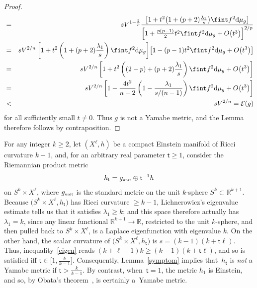 \documentclass[10pt,a4paper]{amsart}
\numberwithin{equation}{section}
\def\RR{\mathbb{R}}
\begin{document}
\begin{proof}
\begin{eqnarray*}
&=&sV^{1-\frac{2}{p}} \frac{\left[ 1+ t^2 \big(1+ (p+2)\frac{\lambda_1}{s} \big)\fint f^2 {\rm d}\mu_g\right] }{\left[ 1+ \frac{p(p-1)}{2} t^2\fint f^2 {\rm d}\mu_g +O\big(t^3\big) \right]^{2/p}} \\
&=&sV^{2/n} \left[ 1+ t^2 \left(1+ (p+2)\frac{\lambda_1}{s} \right)\fint f^2 {\rm d}\mu_g\right] }{\left[ 1- (p-1) t^2\fint f^2 {\rm d}\mu_g +O\big(t^3\big) \right] \\
&=&sV^{2/n} \left[ 1+ t^2 \left((2-p)+ (p+2)\frac{\lambda_1}{s} \right)\fint f^2 {\rm d}\mu_g +O\big(t^3\big)\right] \\
&=&sV^{2/n} \left[ 1-\frac{4t^2}{n-2} \left(1- \frac{\lambda_1}{s/(n-1)} \right)\fint f^2 {\rm d}\mu_g +O\big(t^3\big)\right] \\
&<&sV^{2/n}= \mathcal{E}(g)
\end{eqnarray*}
for all sufficiently small $t \neq 0$. Thus $g$ is not a Yamabe metric, and the Lemma therefore follows by contraposition.
\end{proof}

\begin{Example}\label{zamp}
For any integer $k\geq 2$, let $(X^\ell , h)$ be a compact Einstein manifold of Ricci curvature $k-1$, and,
for an arbitrary real parameter
$\mathsf{t} \geq 1$, consider the Riemannian product metric
\begin{equation}
\label{squeeze}
h_{\mathsf{t}}= g_{\text{\tiny unit}} \oplus \mathsf{t}^{-1} h
\end{equation}
 on $S^k \times X^\ell$, where $g_{\text{\tiny unit}}$ is the standard metric on the unit $k$-sphere $S^k \subset \RR^{k+1}$.
 Because $\big(S^k \times X^\ell, h_{\mathsf{t}}\big)$ has Ricci curvature $\geq k-1$,
 Lichnerowicz's eigenvalue estimate \cite{lichnebook} tells us that it satisfies $\lambda_1 \geq k$; and
 this space therefore actually has $\lambda_1 =k$,
 since any linear functional $\RR^{k+1}\to \RR$,
 restricted to the unit $k$-sphere, and then pulled back to $S^k\times X^\ell$, is a Laplace eigenfunction
 with eigenvalue $k$. On the other hand, the scalar curvature
of $\big(S^k \times X^\ell, h_{\mathsf{t}}\big)$ is $s= (k-1) (k+\mathsf{t}\ell)$.
Thus, inequality~\eqref{eigen} reads $(k+\ell -1) k \geq (k-1) (k+\mathsf{t}\ell)$, and so is
 satisfied iff
$\mathsf{t}\in \big[1,\frac{k}{k-1}\big]$. Consequently, Lemma~\ref{symptom} implies that~$h_{\mathsf{t}}$ is {\em not}
 a Yamabe metric if $\mathsf{t}> \frac{k}{k-1}$. By contrast, when~$\mathsf{t}=1$,
the metric $h_1$ is Einstein, and so, by Obata's theorem~\cite{obata}, is certainly a~Yamabe metric.
\end{Example}
\end{document}
